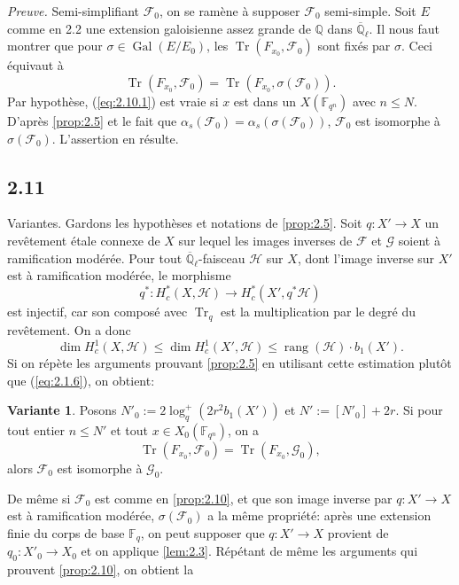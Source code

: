 \documentclass[11pt,a4paper]{article}
\theoremstyle{plain}
\theoremstyle{definition}
\newtheorem{variante}[theorem]{Variante}
\DeclareMathOperator{\Gal}{Gal}
\DeclareMathOperator{\tr}{Tr}
\DeclareMathOperator{\rang}{rang}
\begin{document}
\noindent\textit{Preuve.} Semi-simplifiant $\mathcal{F}_0$, on se ram\`ene \`a supposer $\mathcal{F}_0$ semi-simple. Soit $E$ comme en 2.2 une extension galoisienne assez grande de $\mathbb{Q}$ dans $\overline{\mathbb{Q}}_\ell$. Il nous faut montrer que pour $\sigma \in \Gal(E/E_0)$, les $\tr(F_{x_0}, \mathcal{F}_0)$ sont fix\'es par $\sigma$. Ceci \'equivaut \`a
\begin{equation}\label{eq:2.10.1}
\tr(F_{x_0}, \mathcal{F}_0) = \tr(F_{x_0}, \sigma(\mathcal{F}_0)).
\end{equation}
Par hypoth\`ese, (\ref{eq:2.10.1}) est vraie si $x$ est dans un $X(\mathbb{F}_{q^n})$ avec $n \leq N$. D'apr\`es \ref{prop:2.5} et le fait que $\alpha_s(\mathcal{F}_0) = \alpha_s(\sigma(\mathcal{F}_0))$, $\mathcal{F}_0$ est isomorphe \`a $\sigma(\mathcal{F}_0)$. L'assertion en r\'esulte.

\subsection{2.11}

Variantes. Gardons les hypoth\`eses et notations de \ref{prop:2.5}. Soit $q: X' \to X$ un rev\^etement \'etale connexe de $X$ sur lequel les images inverses de $\mathcal{F}$ et $\mathcal{G}$ soient \`a ramification mod\'er\'ee. Pour tout $\overline{\mathbb{Q}}_\ell$-faisceau $\mathcal{H}$ sur $X$, dont l'image inverse sur $X'$ est \`a ramification mod\'er\'ee, le morphisme
\[
q^*: H_c^*(X, \mathcal{H}) \to H_c^*(X', q^*\mathcal{H})
\]
est injectif, car son compos\'e avec $\tr_q$ est la multiplication par le degr\'e du rev\^etement. On a donc
\[
\dim H_c^1(X, \mathcal{H}) \leq \dim H_c^1(X', \mathcal{H}) \leq \rang(\mathcal{H}) \cdot b_1(X').
\]
Si on r\'ep\`ete les arguments prouvant \ref{prop:2.5} en utilisant cette estimation plut\^ot que (\ref{eq:2.1.6}), on obtient:

\begin{variante}\label{var:2.12}
Posons $N'_0 := 2\log_q^+(2r^2 b_1(X'))$ et $N' := [N'_0]+2r$. Si pour tout entier $n \leq N'$ et tout $x \in X_0(\mathbb{F}_{q^n})$, on a
\[
\tr(F_{x_0}, \mathcal{F}_0) = \tr(F_{x_0}, \mathcal{G}_0),
\]
alors $\mathcal{F}_0$ est isomorphe \`a $\mathcal{G}_0$.
\end{variante}

De m\^eme si $\mathcal{F}_0$ est comme en \ref{prop:2.10}, et que son image inverse par $q: X' \to X$ est \`a ramification mod\'er\'ee, $\sigma(\mathcal{F}_0)$ a la m\^eme propri\'et\'e: apr\`es une extension finie du corps de base $\mathbb{F}_q$, on peut supposer que $q: X' \to X$ provient de $q_0: X'_0 \to X_0$ et on applique \ref{lem:2.3}. R\'ep\'etant de m\^eme les arguments qui prouvent \ref{prop:2.10}, on obtient la
\end{document}
